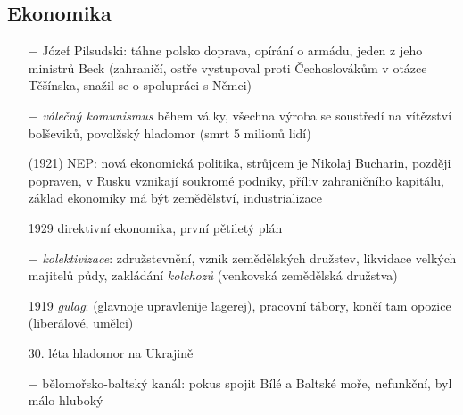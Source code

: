\documentclass{article}
\begin{document}
\subsection*{Ekonomika}
\begin{itemize}
    \vspace{-0.5em}
    \setlength\itemsep{0.15em}
    \item[$-$] Józef Pilsudski: táhne polsko doprava, opírání o armádu, jeden z jeho ministrů Beck (zahraničí, ostře vystupoval proti Čechoslovákům v otázce Těšínska, snažil se o spolupráci s Němci)
    \item[$-$] \textit{válečný komunismus} během války, všechna výroba se soustředí na vítězství bolševiků, povolžský hladomor (smrt 5 milionů lidí)
    \item[(1921)] NEP: nová ekonomická politika, strůjcem je Nikolaj Bucharin, později popraven, v Rusku vznikají soukromé podniky, příliv zahraničního kapitálu, základ ekonomiky má být zemědělství, industrializace
    \item[1929] direktivní ekonomika, první pětiletý plán
    \item[$-$] \textit{kolektivizace}: združstevnění, vznik zemědělských družstev, likvidace velkých majitelů půdy, zakládání \textit{kolchozů} (venkovská zemědělská družstva)
    \item[1919] \textit{gulag}: (glavnoje upravlenije lagerej), pracovní tábory, končí tam opozice (liberálové, umělci)
    \item[30. léta] hladomor na Ukrajině
    \item[$-$] bělomořsko-baltský kanál: pokus spojit Bílé a Baltské moře, nefunkční, byl málo hluboký
\end{itemize}
\end{document}
